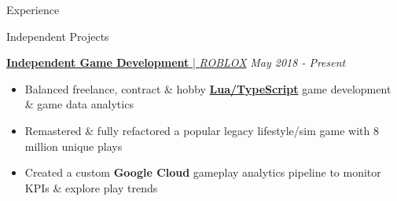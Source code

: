 \documentclass{resume/resume}
\begin{document}
\begin{rSection}{Experience}
  
\end{rSection}

\begin{rSection}{Independent Projects}
  

  \href{https://www.roblox.com/games/849680368/Robloxaville-Next-Generation-BETA}{{\bf Independent Game Development} | {\em ROBLOX}} \hfill {\em May 2018 - Present}
  \vspace{-6pt}
  \begin{itemize}[nosep]
    \item Balanced freelance, contract \& hobby \href{https://github.com/search?p=1&q=user\%3ASpelkington+extension\%3Ats+extension\%3Atsx+extension\%3Alua&type=Code}{\bf Lua/TypeScript} game development \& game data analytics
    \item Remastered \& fully refactored a popular legacy lifestyle/sim game with 8 million unique plays
    \item Created a custom {\bf Google Cloud} gameplay analytics pipeline to monitor KPIs \& explore play trends
  \end{itemize}
  

\end{rSection}
\end{document}

